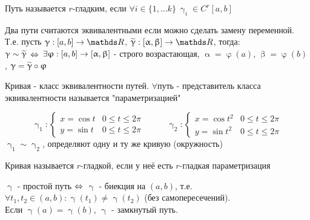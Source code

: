 \documentclass[11pt, fleqn]{article}
\begin{document}
\begin{Property}[3]
\begin{Property}[4]
\begin{Property}[2, аддитивность]
\begin{Proof}
\begin{definition}
    Путь называется $r$-гладким, если $\forall i \in \{1,...k\}\ \upgamma_i \in C^r[a,b]$
\end{definition}

\begin{definition}
    Два пути считаются эквивалентными если можно сделать замену переменной. Т.е. пусть $\upgamma: [a,b] \rightarrow \R$, $\w{\upgamma}: [\upalpha, \upbeta] \rightarrow \R$, тогда: 
    \\
    $\upgamma \sim \widetilde{\upgamma}$ $\Leftrightarrow$ $\exists \upvarphi: [a,b] \rightarrow [\upalpha, \upbeta]$ - строго возрастающая, $\upalpha = \upvarphi (a)$, $\upbeta = \upvarphi (b)$, $\upgamma = \widetilde{\upgamma} \circ \upvarphi$
\end{definition}

\begin{definition}
    Кривая - класс эквивалентности путей. $\forall$путь - представитель класса эквивалентности называется "параметризацией"
\end{definition}

\begin{Example}
    \begin{equation*}
    \upgamma_1: \begin{cases}
       x = \cos t & 0 \leqslant t \leqslant 2 \pi\\
       y = \sin t & 0 \leqslant t \leqslant 2 \pi
    \end{cases}\ \ \ \ \ \ \ \ \ \ \ \ 
    \upgamma_2: \begin{cases}
       x = \cos t^2 & 0 \leqslant t \leqslant 2 \pi\\
       y = \sin t^2 & 0 \leqslant t \leqslant 2 \pi
     \end{cases}
    \end{equation*}
    $\upgamma_1 \sim \upgamma_2$, определяют одну и ту же кривую (окружность)
\end{Example}

\begin{definition}
    Кривая называется $r$-гладкой, если у неё есть $r$-гладкая параметризация
\end{definition}

\begin{definition}
    $\upgamma$ - простой путь $\Leftrightarrow$ $\upgamma$ - биекция на $(a,b)$, т.е. $\forall t_1, t_2 \in (a,b): \upgamma(t_1) \neq \upgamma(t_2)$ (без самопересечений). \\
	Если $\upgamma(a) = \upgamma(b)$, $\upgamma$ - замкнутый путь.
\end{definition}


\end{Proof}
\end{Property}
\end{Property}
\end{Property}
\end{document}
